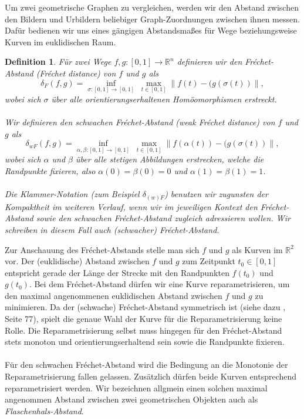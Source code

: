 \documentclass[a4paper, 12pt, twoside]{article}
\theoremstyle{Format1} %
\newtheorem{Def}{Definition}[section]       %
\begin{document}
	Um zwei geometrische Graphen zu vergleichen, werden wir den Abstand zwischen den Bildern und Urbildern beliebiger Graph-Zuordnungen zwischen ihnen
	messen. Dafür bedienen wir uns eines gängigen Abstandsmaßes für Wege beziehungsweise Kurven im euklidischen Raum.

\begin{Def} \label{Definition Fréchet-Abstand}
	Für zwei Wege $ f, g: [0,1] \to \mathbb{R}^n $ definieren wir den \textit{Fréchet-Abstand (Fréchet distance)} von $f$ und $g$ als
	$$ \delta_F(f,g) =  \inf_{\sigma:[0,1] \to [0,1]} \; \max_{t \in [0,1]} \lVert f(t)-(g(\sigma(t)) \rVert, $$
	wobei sich $\sigma $ über alle orientierungserhaltenen Homöomorphismen erstreckt.
	\\
	\\
	Wir definieren den \textit{schwachen Fréchet-Abstand (weak Fréchet distance)} von $f$ und $g$ als
	$$\delta_{wF}(f,g) =\inf_{\alpha , \beta :[0,1] \to [0,1]} \; \max_{t \in [0,1]} \lVert f(\alpha(t))-(g(\sigma(t)) \rVert,$$
	wobei sich $\alpha$ und $\beta$ über alle stetigen Abbildungen erstrecken, welche die Randpunkte fixieren, also $\alpha(0) = \beta(0) = 0$
	und $\alpha(1) = \beta(1) = 1$.
	\\
	\\
	Die Klammer-Notation (zum Beispiel $ \delta_{(w)F} $) benutzen wir zugunsten der Kompaktheit im weiteren Verlauf, wenn wir im jeweiligen Kontext
	den Fréchet-Abstand sowie den schwachen Fréchet-Abstand zugleich adressieren wollen. Wir schreiben in diesem Fall auch \textit{(schwacher) Fréchet-Abstand}.
\end{Def}

Zur Anschauung des Fréchet-Abstands stelle man sich $f$ und $g$ als Kurven im $\mathbb{R}^2$ vor. Der (euklidische) Abstand zwischen $f$ und $g$ zum Zeitpunkt $t_0 \in [0,1]$ entspricht gerade der Länge der Strecke
mit den Randpunkten $f(t_0)$ und $g(t_0)$. Bei dem Fréchet-Abstand dürfen wir eine Kurve reparametrisieren, um den maximal angenommenen euklidischen Abstand zwischen $f$ und $g$ zu minimieren.
Da der (schwache) Fréchet-Abstand symmetrisch ist (siehe dazu \cite{Alt}, Seite 77), spielt die genaue Wahl der Kurve für die Reparametrisierung keine Rolle.
Die Reparametrisierung selbst muss hingegen für den Fréchet-Abstand stets monoton und orientierungserhaltend sein sowie die Randpunkte fixieren.
\\
\\
Für den schwachen Fréchet-Abstand wird die Bedingung an die Monotonie der Reparametrisierung fallen gelassen. Zusätzlich dürfen beide Kurven entsprechend reparametrisiert werden.
Wir bezeichnen allgmein einen solchen maximal angenommen Abstand zwischen zwei geometrischen Objekten auch als \textit{Flaschenhals-Abstand}.
\end{document}
